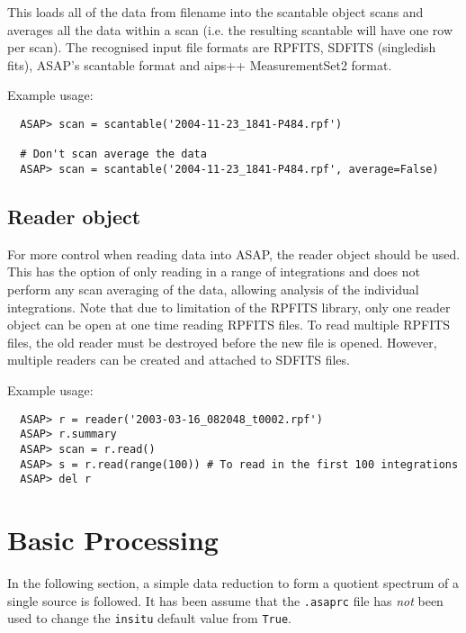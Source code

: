 \documentclass[11pt]{article}
\newcommand{\cmd}[1]{{\tt #1}}
\begin{document}
This loads all of the data from filename into the scantable object scans
and averages all the data within a scan (i.e.  the resulting scantable
will have one row per scan).  The recognised input file formats are
RPFITS, SDFITS (singledish fits), ASAP's scantable format and aips++
MeasurementSet2 format.


Example usage:

\begin{verbatim}
  ASAP> scan = scantable('2004-11-23_1841-P484.rpf')

  # Don't scan average the data
  ASAP> scan = scantable('2004-11-23_1841-P484.rpf', average=False)
\end{verbatim}


\subsection{Reader object}

For more control when reading data into ASAP, the reader object should
be used.  This has the option of only reading in a range of integrations
and does not perform any scan averaging of the data, allowing analysis
of the individual integrations.  Note that due to limitation of the
RPFITS library, only one reader object can be open at one time reading
RPFITS files.  To read multiple RPFITS files, the old reader must be
destroyed before the new file is opened.  However, multiple readers can
be created and attached to SDFITS files.


Example usage:

\begin{verbatim}
  ASAP> r = reader('2003-03-16_082048_t0002.rpf')
  ASAP> r.summary
  ASAP> scan = r.read()
  ASAP> s = r.read(range(100)) # To read in the first 100 integrations
  ASAP> del r
\end{verbatim}

\section{Basic Processing}

In the following section, a simple data reduction to form a quotient
spectrum of a single source is followed.  It has been assume that the
\cmd{.asaprc} file has {\em not} been used to change the \cmd{insitu}
default value from \cmd{True}.

\end{document}
